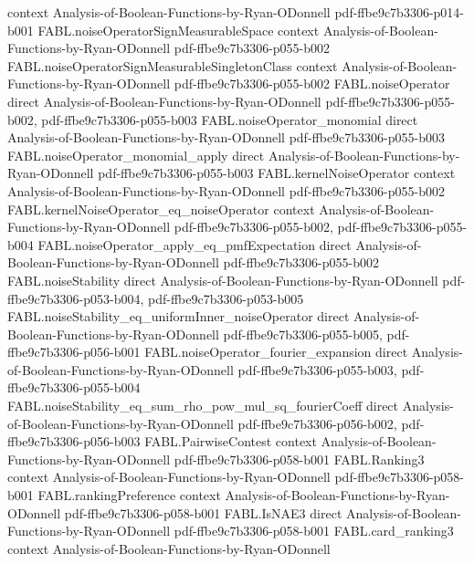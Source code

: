 \begin{theorem}
  {context}
  {Analysis-of-Boolean-Functions-by-Ryan-ODonnell}
  {pdf-ffbe9c7b3306-p014-b001}
\proofstep
  {FABL.noiseOperatorSignMeasurableSpace}
  {context}
  {Analysis-of-Boolean-Functions-by-Ryan-ODonnell}
  {pdf-ffbe9c7b3306-p055-b002}
\proofstep
  {FABL.noiseOperatorSignMeasurableSingletonClass}
  {context}
  {Analysis-of-Boolean-Functions-by-Ryan-ODonnell}
  {pdf-ffbe9c7b3306-p055-b002}
\proofstep
  {FABL.noiseOperator}
  {direct}
  {Analysis-of-Boolean-Functions-by-Ryan-ODonnell}
  {pdf-ffbe9c7b3306-p055-b002,
    pdf-ffbe9c7b3306-p055-b003}
\proofstep
  {FABL.noiseOperator_monomial}
  {direct}
  {Analysis-of-Boolean-Functions-by-Ryan-ODonnell}
  {pdf-ffbe9c7b3306-p055-b003}
\proofstep
  {FABL.noiseOperator_monomial_apply}
  {direct}
  {Analysis-of-Boolean-Functions-by-Ryan-ODonnell}
  {pdf-ffbe9c7b3306-p055-b003}
\proofstep
  {FABL.kernelNoiseOperator}
  {context}
  {Analysis-of-Boolean-Functions-by-Ryan-ODonnell}
  {pdf-ffbe9c7b3306-p055-b002}
\proofstep
  {FABL.kernelNoiseOperator_eq_noiseOperator}
  {context}
  {Analysis-of-Boolean-Functions-by-Ryan-ODonnell}
  {pdf-ffbe9c7b3306-p055-b002,
    pdf-ffbe9c7b3306-p055-b004}
\proofstep
  {FABL.noiseOperator_apply_eq_pmfExpectation}
  {direct}
  {Analysis-of-Boolean-Functions-by-Ryan-ODonnell}
  {pdf-ffbe9c7b3306-p055-b002}
\proofstep
  {FABL.noiseStability}
  {direct}
  {Analysis-of-Boolean-Functions-by-Ryan-ODonnell}
  {pdf-ffbe9c7b3306-p053-b004,
    pdf-ffbe9c7b3306-p053-b005}
\proofstep
  {FABL.noiseStability_eq_uniformInner_noiseOperator}
  {direct}
  {Analysis-of-Boolean-Functions-by-Ryan-ODonnell}
  {pdf-ffbe9c7b3306-p055-b005,
    pdf-ffbe9c7b3306-p056-b001}
\proofstep
  {FABL.noiseOperator_fourier_expansion}
  {direct}
  {Analysis-of-Boolean-Functions-by-Ryan-ODonnell}
  {pdf-ffbe9c7b3306-p055-b003,
    pdf-ffbe9c7b3306-p055-b004}
\proofstep
  {FABL.noiseStability_eq_sum_rho_pow_mul_sq_fourierCoeff}
  {direct}
  {Analysis-of-Boolean-Functions-by-Ryan-ODonnell}
  {pdf-ffbe9c7b3306-p056-b002,
    pdf-ffbe9c7b3306-p056-b003}
\proofstep
  {FABL.PairwiseContest}
  {context}
  {Analysis-of-Boolean-Functions-by-Ryan-ODonnell}
  {pdf-ffbe9c7b3306-p058-b001}
\proofstep
  {FABL.Ranking3}
  {context}
  {Analysis-of-Boolean-Functions-by-Ryan-ODonnell}
  {pdf-ffbe9c7b3306-p058-b001}
\proofstep
  {FABL.rankingPreference}
  {context}
  {Analysis-of-Boolean-Functions-by-Ryan-ODonnell}
  {pdf-ffbe9c7b3306-p058-b001}
\proofstep
  {FABL.IsNAE3}
  {direct}
  {Analysis-of-Boolean-Functions-by-Ryan-ODonnell}
  {pdf-ffbe9c7b3306-p058-b001}
\proofstep
  {FABL.card_ranking3}
  {context}
  {Analysis-of-Boolean-Functions-by-Ryan-ODonnell}

\end{theorem}
